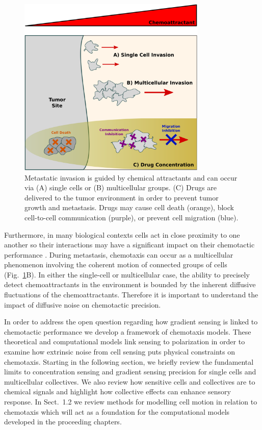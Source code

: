 \begin{figure}[ht]
    \centering
        \includegraphics[width=0.8\textwidth]{../fig/ch1_fig1.pdf}
    \caption{Metastatic invasion is guided by chemical attractants and can occur via (A) single cells or (B) multicellular groups. (C) Drugs are delivered to the tumor environment in order to prevent tumor growth and metastasis. Drugs may cause cell death (orange), block cell-to-cell communication (purple), or prevent cell migration (blue).}
\label{fig:ch1_1}
\end{figure}


Furthermore, in many biological contexts cells act in close proximity to one another so their interactions may have a significant impact on their chemotactic performance \cite{theveneau2010collective}. During metastasis, chemotaxis can occur as a multicellular phenomenon involving the coherent motion of connected groups of cells (Fig.\ \ref{fig:ch1_1}B). In either the single-cell or multicellular case, the ability to precisely detect chemoattractants in the environment is bounded by the inherent diffusive fluctuations of the chemoattractants. Therefore it is important to understand the impact of diffusive noise on chemotactic precision.

In order to address the open question regarding how gradient sensing is linked to chemotactic performance we develop a framework of chemotaxis models. These theoretical and computational models
link sensing to polarization in order to examine how extrinsic noise from cell sensing puts physical constraints on chemotaxis. Starting in the following section, we briefly review the fundamental limits to concentration sensing and gradient sensing precision for single cells and multicellular collectives.
We also review how sensitive cells and collectives are to chemical signals and highlight how collective effects can enhance sensory response.
In Sect.\ 1.2 we review methods for modelling cell motion in relation to chemotaxis which will act as a foundation for the computational models developed in the proceeding chapters.

